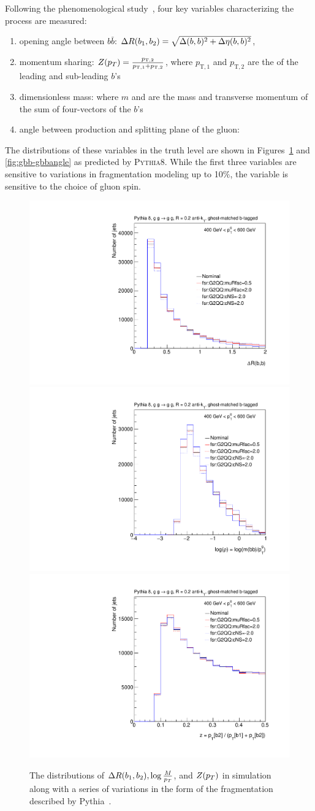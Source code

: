 Following the phenomenological study~\cite{Ilten:2017rbd}, four key variables characterizing the \gbb process are measured:
\begin{enumerate}
\item opening angle between $b\bar b$: ${ \Delta R(b_1, b_2) } = \sqrt{ \Delta(b,b)^2+\Delta \eta(b,b)^2 }$,
\item momentum sharing: $Z(p_T) = \frac{ p_{\text{T},2} }{ p_{\text{T},1}+p_{\text{T},2} }$, where $p_{\text{T},1}$ and $p_{\text{T},2}$ are the \pt of the leading and sub-leading $b$'s
\item dimensionless mass: \mpt where $m$ and \pt are the mass and transverse momentum of the sum of four-vectors of the $b$'s
\item angle between production and splitting plane of the gluon: \dphi
\end{enumerate}

The distributions of these variables in the truth level are shown in Figures~\ref{fig:gbb-gbbdistributions} and \ref{fig:gbb-gbbangle} as predicted by \textsc{Pythia8}. While the first three variables are sensitive to variations in fragmentation modeling up to 10$\%$, the \dphi variable is sensitive to the choice of gluon spin. 



\begin{figure}[htpb!]
\begin{center}
\includegraphics[width=0.33\linewidth]{figures/gbb/truth_level/DeltaRbb.pdf}\includegraphics[width=0.33\linewidth]{figures/gbb/truth_level/rhobb.pdf}\includegraphics[width=0.33\linewidth]{figures/gbb/truth_level/DeltaZbb.pdf}
\caption{The distributions of ${ \Delta R(b_1, b_2) }, \log{\frac{M}{p_T}}$, and $Z(p_T)$ in simulation along with a series of variations in the form of the fragmentation described by Pythia~\cite{pythiavariations}.} 
\label{fig:gbb-gbbdistributions}
\end{center}
\end{figure}

